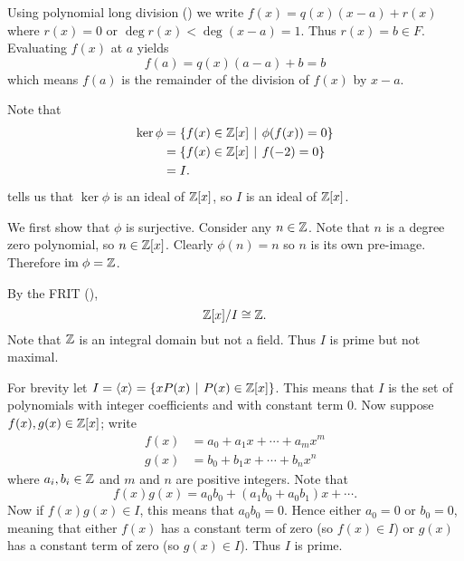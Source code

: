 \begin{questions}
    \item Using polynomial long division () we write $f(x) = q(x)(x-a) + r(x)$ where $r(x) = 0$ or $ \deg r(x) < \deg(x-a) = 1$. Thus $r(x) = b \in F$. Evaluating $f(x)$ at $a$ yields
    \[
        f(a) = q(x)(a-a) + b = b
    \]
    which means $f(a)$ is the remainder of the division of $f(x)$ by $x-a$.

    \item \begin{partquestions}{\roman*}
        \item Note that
        \begin{align*}
            \ker\phi &= \{f(x) \in \Z[x] \vert \phi(f(x)) = 0\}\\
            &= \{f(x) \in \Z[x] \vert f(-2) = 0\}\\
            &= I.
        \end{align*}
         tells us that $\ker\phi$ is an ideal of $\mathbb{Z}[x]$, so $I$ is an ideal of $\mathbb{Z}[x]$.

        \item We first show that $\phi$ is surjective. Consider any $n \in \mathbb{Z}$. Note that $n$ is a degree zero polynomial, so $n \in \mathbb{Z}[x]$. Clearly $\phi(n) = n$ so $n$ is its own pre-image. Therefore $\mathrm{im}\;\phi = \mathbb{Z}$.

        By the FRIT (),
        \[
            \mathbb{Z}[x]/I \cong \mathbb{Z}.
        \]
        Note that $\mathbb{Z}$ is an integral domain but not a field. Thus $I$ is prime but not maximal.
    \end{partquestions}

    \item For brevity let $I = \princ{x} = \{xP(x) \vert P(x) \in \Z[x]\}$. This means that $I$ is the set of polynomials with integer coefficients and with constant term 0. Now suppose $f(x), g(x) \in \mathbb{Z}[x]$; write
    \begin{align*}
        f(x) &= a_0 + a_1x + \cdots + a_mx^m\\
        g(x) &= b_0 + b_1x + \cdots + b_nx^n
    \end{align*}
    where $a_i, b_i \in \mathbb{Z}$ and $m$ and $n$ are positive integers. Note that
    \[
        f(x)g(x) = a_0b_0 + (a_1b_0+a_0b_1)x + \cdots.
    \]
    Now if $f(x)g(x) \in I$, this means that $a_0b_0 = 0$. Hence either $a_0 = 0$ or $b_0 = 0$, meaning that either $f(x)$ has a constant term of zero (so $f(x) \in I$) or $g(x)$ has a constant term of zero (so $g(x) \in I$). Thus $I$ is prime.


\end{questions}
